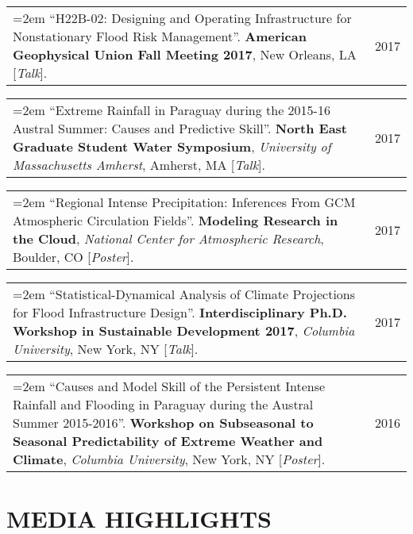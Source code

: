 \documentclass[10pt,oneside]{article}
\makeatletter
\newenvironment{alignedentrieshang}[1][2em]{%
  \noindent%
}{%
}
\newcommand{\hangingitem}[2]{%
  \noindent%
  \begin{tabular*}{\textwidth}{@{}p{0.85\textwidth}@{\extracolsep{\fill}}r@{}}%
    \hangindent=2em \hangafter=1 #1 & #2%
  \end{tabular*}%
}
\makeatother
\begin{document}
\begin{alignedentrieshang}
\hangingitem{\enquote{H22B-02: Designing and Operating Infrastructure for Nonstationary Flood Risk Management}. \textbf{American Geophysical Union Fall Meeting 2017}, New Orleans, LA [\textit{Talk}].}{2017}



\hangingitem{\enquote{Extreme Rainfall in Paraguay during the 2015-16 Austral Summer: Causes and Predictive Skill}. \textbf{North East Graduate Student Water Symposium}, \textit{University of Massachusetts Amherst}, Amherst, MA [\textit{Talk}].}{2017}



\hangingitem{\enquote{Regional Intense Precipitation: Inferences From GCM Atmospheric Circulation Fields}. \textbf{Modeling Research in the Cloud}, \textit{National Center for Atmospheric Research}, Boulder, CO [\textit{Poster}].}{2017}



\hangingitem{\enquote{Statistical-Dynamical Analysis of Climate Projections for Flood Infrastructure Design}. \textbf{Interdisciplinary Ph.D. Workshop in Sustainable Development 2017}, \textit{Columbia University}, New York, NY [\textit{Talk}].}{2017}



\hangingitem{\enquote{Causes and Model Skill of the Persistent Intense Rainfall and Flooding in Paraguay during the Austral Summer 2015-2016}. \textbf{Workshop on Subseasonal to Seasonal Predictability of Extreme Weather and Climate}, \textit{Columbia University}, New York, NY [\textit{Poster}].}{2016}


\end{alignedentrieshang}

\section{MEDIA HIGHLIGHTS}
\end{document}
